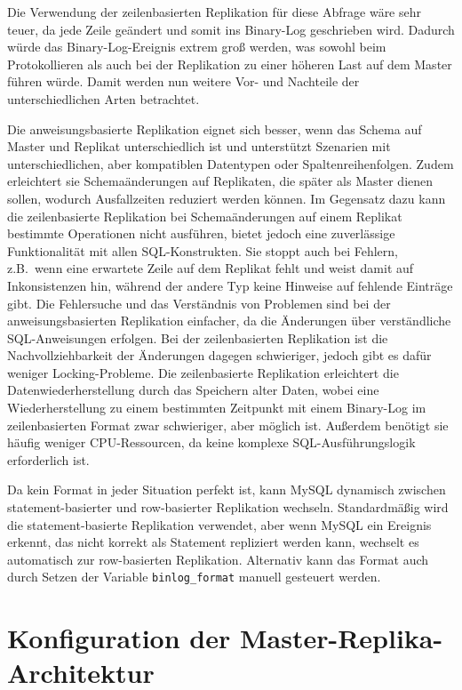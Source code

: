 Die Verwendung der zeilenbasierten Replikation für diese Abfrage wäre sehr teuer, da jede Zeile geändert und somit ins Binary-Log geschrieben wird.
Dadurch würde das Binary-Log-Ereignis extrem groß werden, was sowohl beim Protokollieren als auch bei der Replikation zu einer höheren Last auf dem Master führen würde.
Damit werden nun weitere Vor- und Nachteile der unterschiedlichen Arten betrachtet.

Die anweisungsbasierte Replikation eignet sich besser, wenn das Schema auf Master und Replikat unterschiedlich ist und unterstützt Szenarien mit unterschiedlichen, aber kompatiblen Datentypen oder Spaltenreihenfolgen.
Zudem erleichtert sie Schemaänderungen auf Replikaten, die später als Master dienen sollen, wodurch Ausfallzeiten reduziert werden können.
Im Gegensatz dazu kann die zeilenbasierte Replikation bei Schemaänderungen auf einem Replikat bestimmte Operationen nicht ausführen, bietet jedoch eine zuverlässige Funktionalität mit allen SQL-Konstrukten.
Sie stoppt auch bei Fehlern, z.B.\ wenn eine erwartete Zeile auf dem Replikat fehlt und weist damit auf Inkonsistenzen hin, während der andere Typ keine Hinweise auf fehlende Einträge gibt.
Die Fehlersuche und das Verständnis von Problemen sind bei der anweisungsbasierten Replikation einfacher, da die Änderungen über verständliche SQL-Anweisungen erfolgen.
Bei der zeilenbasierten Replikation ist die Nachvollziehbarkeit der Änderungen dagegen schwieriger, jedoch gibt es dafür weniger Locking-Probleme.
Die zeilenbasierte Replikation erleichtert die Datenwiederherstellung durch das Speichern alter Daten, wobei eine Wiederherstellung zu einem bestimmten Zeitpunkt mit einem Binary-Log im zeilenbasierten Format zwar schwieriger, aber möglich ist.
Außerdem benötigt sie häufig weniger CPU-Ressourcen, da keine komplexe SQL-Ausführungslogik erforderlich ist.

Da kein Format in jeder Situation perfekt ist, kann MySQL dynamisch zwischen statement-basierter und row-basierter Replikation wechseln.
Standardmäßig wird die statement-basierte Replikation verwendet, aber wenn MySQL ein Ereignis erkennt, das nicht korrekt als Statement repliziert werden kann, wechselt es automatisch zur row-basierten Replikation.
Alternativ kann das Format auch durch Setzen der Variable \texttt{binlog\_format} manuell gesteuert werden.

\section{Konfiguration der Master-Replika-Architektur}\label{sec:replication-konfiguration}

